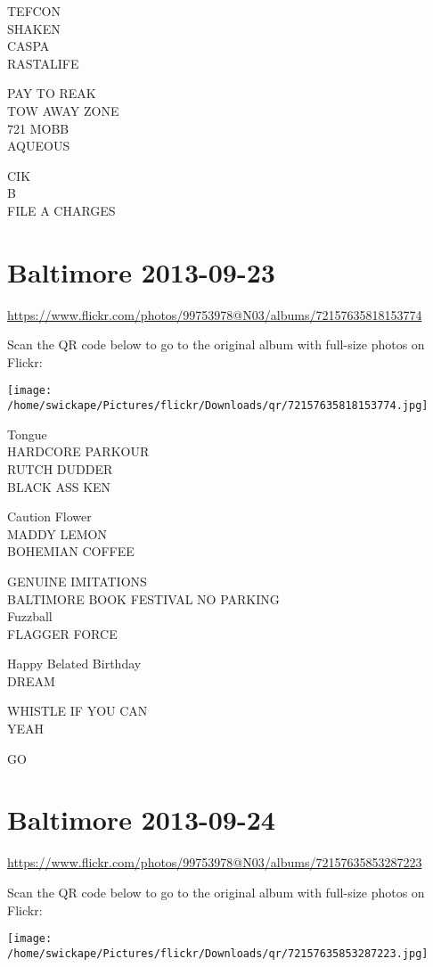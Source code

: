 \documentclass[10pt,letterpaper]{article}
\begin{document}
TEFCON\\
SHAKEN\\
CASPA\\
RASTALIFE

PAY TO REAK\\
TOW AWAY ZONE\\
721 MOBB\\
AQUEOUS

CIK\\
B\\
FILE A CHARGES
\pagebreak

\section*{Baltimore 2013-09-23}

\url{https://www.flickr.com/photos/99753978@N03/albums/72157635818153774}

Scan the QR code below to go to the original album with full-size photos on Flickr:

\texttt{[image: /home/swickape/Pictures/flickr/Downloads/qr/72157635818153774.jpg]}
\pagebreak

Tongue\\
HARDCORE PARKOUR\\
RUTCH DUDDER\\
BLACK ASS KEN

Caution Flower\\
MADDY LEMON\\
BOHEMIAN COFFEE

GENUINE IMITATIONS\\
BALTIMORE BOOK FESTIVAL NO PARKING\\
Fuzzball\\
FLAGGER FORCE

Happy Belated Birthday\\
DREAM

WHISTLE IF YOU CAN\\
YEAH

GO
\pagebreak

\section*{Baltimore 2013-09-24}

\url{https://www.flickr.com/photos/99753978@N03/albums/72157635853287223}

Scan the QR code below to go to the original album with full-size photos on Flickr:

\texttt{[image: /home/swickape/Pictures/flickr/Downloads/qr/72157635853287223.jpg]}
\pagebreak
\end{document}
